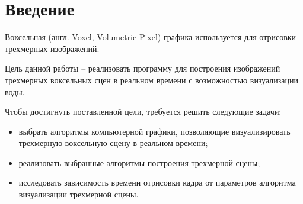 \chapter*{Введение}

Воксельная (англ. Voxel, Volumetric Pixel) графика используется для отрисовки 
трехмерных изображений. 

Цель данной работы -- реализовать программу для построения 
изображений трехмерных воксельных сцен в реальном времени
с возможностью визуализации воды.

Чтобы достигнуть поставленной цели, требуется решить следующие задачи:
\begin{itemize}
    \item выбрать алгоритмы компьютерной 
          графики, позволяющие визуализировать трехмерную воксельную
          сцену в реальном времени;
    \item реализовать выбранные алгоритмы построения трехмерной сцены;
    \item исследовать зависимость времени отрисовки кадра от 
          параметров алгоритма визуализации трехмерной сцены.
\end{itemize}
